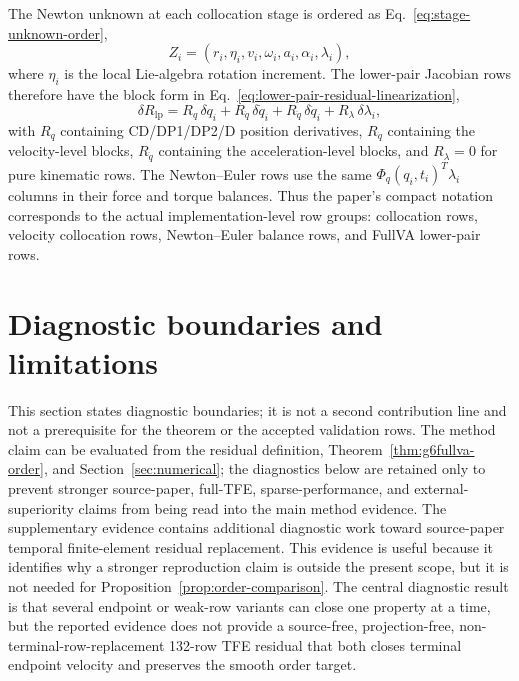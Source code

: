 \documentclass[preprint,12pt]{elsarticle}
\newcommand{\tfe}{TFE}
\begin{document}
The Newton unknown at each collocation stage is ordered as
Eq.~\eqref{eq:stage-unknown-order},
\begin{equation}
\label{eq:stage-unknown-order}
  Z_i=(r_i,\eta_i,v_i,\omega_i,a_i,\alpha_i,\lambda_i),
\end{equation}
where $\eta_i$ is the local Lie-algebra rotation increment. The lower-pair
Jacobian rows therefore have the block form in
Eq.~\eqref{eq:lower-pair-residual-linearization},
\begin{equation}
\label{eq:lower-pair-residual-linearization}
  \delta R_{\mathrm{lp}} =
  R_q\,\delta q_i + R_{\dot q}\,\delta \dot q_i+
  R_{\ddot q}\,\delta \ddot q_i+R_\lambda\,\delta\lambda_i,
\end{equation}
with $R_q$ containing CD/DP1/DP2/D position derivatives, $R_{\dot q}$
containing the velocity-level blocks, $R_{\ddot q}$ containing the
acceleration-level blocks, and $R_\lambda=0$ for pure kinematic rows. The
Newton--Euler rows use the same $\Phi_q(q_i,t_i)^T\lambda_i$ columns in their
force and torque balances. Thus the paper's compact notation corresponds to
the actual implementation-level row groups: collocation rows, velocity
collocation rows, Newton--Euler balance rows, and FullVA lower-pair rows.

\section{Diagnostic boundaries and limitations}

This section states diagnostic boundaries; it is not a second contribution line
and not a prerequisite for the theorem or the accepted validation rows.  The
method claim can be evaluated from the residual definition,
Theorem~\ref{thm:g6fullva-order}, and Section~\ref{sec:numerical}; the
diagnostics below are retained only to prevent stronger source-paper,
full-\tfe{}, sparse-performance, and external-superiority claims from being
read into the main method evidence.
The supplementary evidence contains additional diagnostic work toward
source-paper temporal finite-element residual replacement. This evidence is
useful because it identifies why a stronger reproduction claim is outside the
present scope, but it is not needed for
Proposition~\ref{prop:order-comparison}. The central diagnostic result is
that several endpoint or weak-row variants can close one property at a time,
but the reported evidence does not provide a source-free, projection-free,
non-terminal-row-replacement 132-row \tfe{} residual that both closes terminal
endpoint velocity and preserves the smooth order target.
\end{document}
